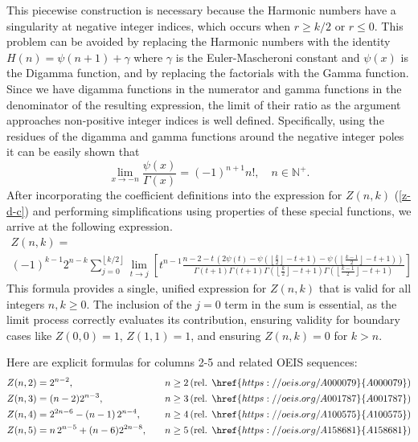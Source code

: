 \documentclass{article}
\newcommand{\floor}[1]{\left\lfloor #1 \right\rfloor}
\begin{document}
This piecewise construction is necessary because the Harmonic numbers have a singularity at negative integer indices, which occurs when $r \geq k/2$ or $r\leq 0$. This problem can be avoided by replacing the Harmonic numbers with the identity $H(n) = \psi(n+1)+\gamma$ where $\gamma$ is the Euler-Mascheroni constant and $\psi(x)$ is the Digamma function, and by replacing the factorials with the Gamma function. Since we have digamma functions in the numerator and gamma functions in the denominator of the resulting expression, the limit of their ratio as the argument approaches non-positive integer indices is well defined. Specifically, using the residues of the digamma and gamma functions around the negative integer poles it can be easily shown that
$$
\lim_{x \to -n}\frac{\psi(x)}{\Gamma(x)} = (-1)^{n+1}n!, \quad n \in\mathbb{N}^{+}.
$$
After incorporating the coefficient definitions into the expression for $Z(n,k)$ (\ref{z-d-c}) and performing simplifications using properties of these special functions, we arrive at the following expression. 
$$
\begin{aligned}
    Z(n,k) =\\
    (-1)^{k-1} 2^{n-k} \sum_{j=0}^{\floor{k/2}} \lim_{t \to j} \left[t^{n-1}
        \frac
            {n-2-t\,\left(2\psi(t)-\psi\left(\floor{\frac{k}{2}}-t+1\right)-\psi\left(\floor{\frac{k-1}{2}}-t+1\right)\right)}
            {\Gamma(t+1) \Gamma(t+1) \Gamma(\floor{\frac{k}{2}}-t+1) \Gamma(\floor{\frac{k-1}{2}}-t+1)}\right]
\end{aligned}
$$
This formula provides a single, unified expression for $Z(n,k)$ that is valid for all integers $n,k \geq 0$. The inclusion of the $j=0$ term in the sum is essential, as the limit process correctly evaluates its contribution, ensuring validity for boundary cases like $Z(0,0)=1$, $ Z(1,1)=1$, and ensuring $Z(n,k)=0$ for $k>n$.

Here are explicit formulas for columns 2-5 and related OEIS sequences:
\[
    \begin{aligned}
        Z(n,2) &= 2^{n-2}, & \quad n \ge 2\, (\text{rel. } \href{https://oeis.org/A000079}{A000079})\\
        Z(n,3) &= (n-2)2^{n-3}, & \quad n \ge 3\, (\text{rel. } \href{https://oeis.org/A001787}{A001787})\\
        Z(n,4) &= 2^{2n-6}-(n-1)\,2^{n-4}, & n\geq 4 \, (\text{rel. } \href{https://oeis.org/A100575}{A100575})\\
        Z(n,5) &= n\,2^{n-5}+(n-6) 2^{2n-8}, & n\geq 5 \, (\text{rel. } \href{https://oeis.org/A158681}{A158681})\\
    \end{aligned}
\]
\end{document}
